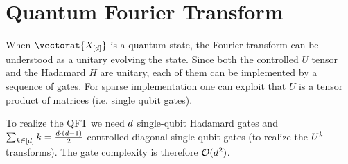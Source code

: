 \section{Quantum Fourier Transform}

When $\vectorat{\shortcatvariables}$ is a quantum state, the Fourier transform can be understood as a unitary evolving the state.
Since both the controlled $U$ tensor and the Hadamard $H$ are unitary, each of them can be implemented by a sequence of gates.
For sparse implementation one can exploit that $U$ is a tensor product of matrices (i.e. single qubit gates).

To realize the QFT we need $d$ single-qubit Hadamard gates and $\sum_{k\in[d]} k = \frac{d\cdot(d-1)}{2}$ controlled diagonal single-qubit gates (to realize the $U^{k}$ transforms).
The gate complexity is therefore $\mathcal{O}(d^2)$.